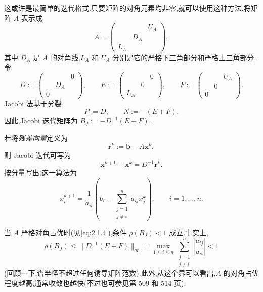这或许是最简单的迭代格式.只要矩阵的对角元素均非零,就可以使用这种方法.将矩阵 \(A\) 表示成
\begin{equation}\label{eq:2.3.1}
  A=\begin{pmatrix}
       & &U_A\\
       &D_A&\\
    L_A& &
  \end{pmatrix},
\end{equation}
其中 \(D_A\) 是 \(A\) 的对角线,\(L_A\) 和 \(U_A\) 分别是它的严格下三角部分和严格上三角部分.令
\[
  D:=\begin{pmatrix} & &0\\ &D_A&\\0& &\end{pmatrix},\qquad
  E:=\begin{pmatrix} & &0\\ &0&\\L_A& &\end{pmatrix},\qquad
  F:=\begin{pmatrix} & &U_A\\ &0&\\0& &\end{pmatrix}.
\]
Jacobi 法基于分裂
\begin{equation}\label{eq:2.3.2}
  P:=D,\qquad N:=-(E+F).
\end{equation}
因此,Jacobi 迭代矩阵为 \(B_J:=-D^{-1}(E+F)\).

若将\emph{残差向量}定义为
\begin{equation}\label{eq:2.3.3}
  \boldsymbol{r}^k:=\boldsymbol{b}-A\boldsymbol{x}^k,
\end{equation}
则 Jacobi 迭代可写为
\[
  \boldsymbol{x}^{k+1}-\boldsymbol{x}^k=D^{-1}\boldsymbol{r}^k.
\]
按分量写出,这一算法为
\begin{equation}\label{eq:2.3.4}
  x_i^{k+1}=\frac1{a_{ii}}\left(b_i-
    \sum_{\substack{j=1\\j\ne i}}^n a_{ij}x_j^k\right),
    \qquad i=1,\ldots,n.
\end{equation}

当 \(A\) 严格对角占优时(见\eqref{eq:2.1.4}),条件 \(\rho(B_J)<1\) 成立.事实上,
\[
  \rho(B_J)\le\|D^{-1}(E+F)\|_\infty
  =\max_{1\le i\le n}\sum_{\substack{j=1\\j\ne i}}^n
    \left|\frac{a_{ij}}{a_{ii}}\right|<1
\]
(回顾一下,谱半径不超过任何诱导矩阵范数).此外,从这个界可以看出,\(A\) 的对角占优程度越高,通常收敛也越快(不过也可参见第 509 和 514 页).

